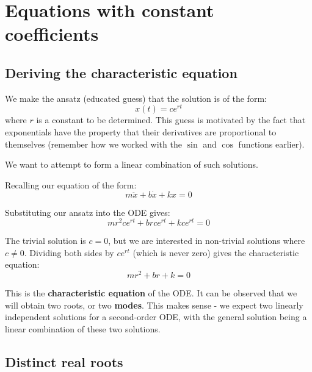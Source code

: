 \section{Equations with constant coefficients}

\subsection{Deriving the characteristic equation}

We make the ansatz (educated guess) that the solution is of the form:
\begin{equation*}
x(t) = c e^{r t}
\end{equation*}
where $r$ is a constant to be determined. This guess is motivated by the fact that exponentials have the property that their derivatives are proportional to themselves (remember how we worked with the $\sin$ and $\cos$ functions earlier).

We want to attempt to form a linear combination of such solutions.

Recalling our equation of the form:
\begin{equation*}
m \ddot x + b \dot x + k x = 0
\end{equation*}

Substituting our ansatz into the ODE gives:
\begin{equation*}
m r^2 c e^{r t} + b r c e^{r t} + k c e^{r t} = 0
\end{equation*}

The trivial solution is $c = 0$, but we are interested in non-trivial solutions where $c \neq 0$. Dividing both sides by $c e^{r t}$ (which is never zero) gives the characteristic equation:
\begin{equation*}
m r^2 + b r + k = 0
\end{equation*}

This is the \textbf{characteristic equation} of the ODE. It can be observed that we will obtain two roots, or two \textbf{modes}. This makes sense - we expect two linearly independent solutions for a second-order ODE, with the general solution being a linear combination of these two solutions.

\subsection{Distinct real roots}

